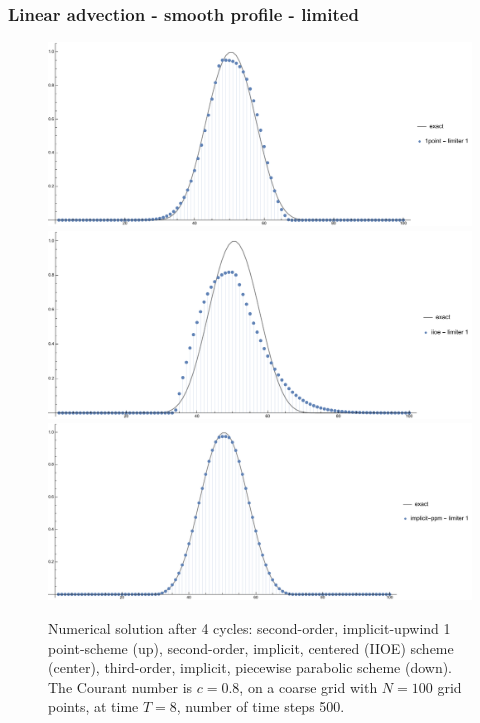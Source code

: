 \documentclass[../thesis.tex]{subfiles}
\begin{document}
\subsubsection{Linear advection - smooth profile - limited}
\begin{figure}[H]
	\centering
	\includegraphics[width=\textwidth]{fig-1point-c0p8-T8-limit1-smooth.pdf}
	\includegraphics[width=\textwidth]{fig-iioe-c0p8-T8-limit1-smooth.pdf}
	\includegraphics[width=\textwidth]{fig-implicit-ppm-c0p8-T8-limit1-smooth.pdf}
	\caption{Numerical solution after 4 cycles: second-order, implicit-upwind 1 point-scheme (up), second-order, implicit, centered (IIOE) scheme (center), third-order, implicit, piecewise parabolic scheme (down). The Courant number is \(c = 0.8\), on a coarse grid with \(N = 100\) grid points, at time \(T = 8\), number of time steps 500.}
	\label{fig:c0p8-T8-limit1-smooth}
\end{figure}
\end{document}
